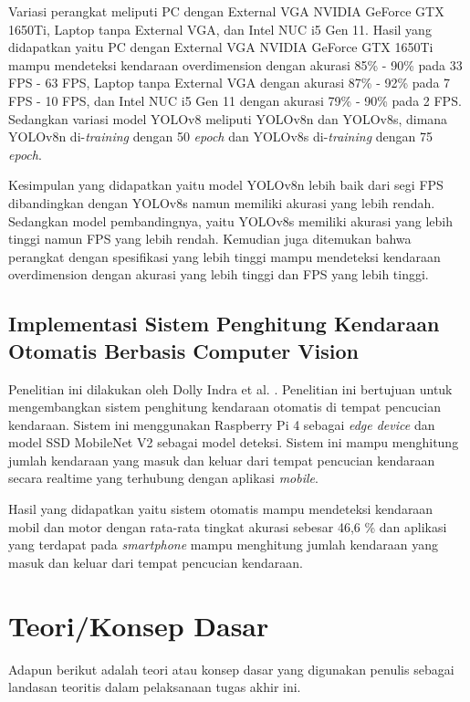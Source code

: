 Variasi perangkat meliputi PC dengan External VGA NVIDIA GeForce GTX 1650Ti, Laptop tanpa External VGA, dan Intel NUC i5 Gen 11. Hasil yang didapatkan yaitu PC dengan External VGA NVIDIA GeForce GTX 1650Ti mampu mendeteksi kendaraan overdimension dengan akurasi 85\% - 90\% pada 33 FPS - 63 FPS, Laptop tanpa External VGA dengan akurasi 87\% - 92\% pada 7 FPS - 10 FPS, dan Intel NUC i5 Gen 11 dengan akurasi 79\% - 90\% pada 2 FPS. Sedangkan variasi model YOLOv8 meliputi YOLOv8n dan YOLOv8s, dimana YOLOv8n di-\emph{training} dengan 50 \emph{epoch} dan YOLOv8s di-\emph{training} dengan 75 \emph{epoch}.

Kesimpulan yang didapatkan yaitu model YOLOv8n lebih baik dari segi FPS dibandingkan dengan YOLOv8s namun memiliki akurasi yang lebih rendah. Sedangkan model pembandingnya, yaitu YOLOv8s memiliki akurasi yang lebih tinggi namun FPS yang lebih rendah. Kemudian juga ditemukan bahwa perangkat dengan spesifikasi yang lebih tinggi mampu mendeteksi kendaraan overdimension dengan akurasi yang lebih tinggi dan FPS yang lebih tinggi.

\subsection{Implementasi Sistem Penghitung Kendaraan Otomatis Berbasis Computer Vision}
\label{subsec:implementasisistemhitungkendaraan}
Penelitian ini dilakukan oleh Dolly Indra et al. \parencite*{dolly2023}. Penelitian ini bertujuan untuk mengembangkan sistem penghitung kendaraan otomatis di tempat pencucian kendaraan. Sistem ini menggunakan Raspberry Pi 4 sebagai \emph{edge device} dan model SSD MobileNet V2 sebagai model deteksi. Sistem ini mampu menghitung jumlah kendaraan yang masuk dan keluar dari tempat pencucian kendaraan secara realtime yang terhubung dengan aplikasi \emph{mobile}.

Hasil yang didapatkan yaitu sistem otomatis mampu mendeteksi kendaraan mobil dan motor dengan rata-rata tingkat akurasi sebesar 46,6 \% dan aplikasi yang terdapat pada \emph{smartphone} mampu menghitung jumlah kendaraan yang masuk dan keluar dari tempat pencucian kendaraan.

\section{Teori/Konsep Dasar}
\label{sec:teorikonsepdasar}
Adapun berikut adalah teori atau konsep dasar yang digunakan penulis sebagai landasan teoritis dalam pelaksanaan tugas akhir ini.

